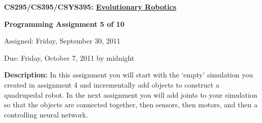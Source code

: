 \documentclass[12pt]{article}
\begin{document}
\centerline{\bf \Large CS295/CS395/CSYS395: \href{CS295_395_Syllabus.pdf}{\underline{Evolutionary Robotics}}}

\vspace{0.5cm}

\centerline{\bf \large Programming Assignment 5 of 10}

\vspace{0.5cm}

\centerline{\large Assigned: Friday, September 30, 2011}

\vspace{0.5cm}

\centerline{\large Due: Friday, October 7, 2011 by midnight}

\vspace{0.5cm}

\noindent \textbf{Description:} In this assignment you will start with the `empty' simulation you created in assignment 4 and incrementally add objects to construct a quadrupedal robot. In the next assignment you will add joints to your simulation so that the objects are connected together, then sensors, then motors, and then a controlling neural network.
\end{document}
